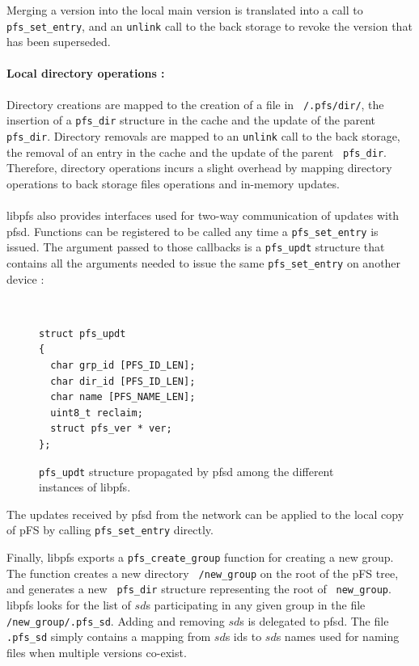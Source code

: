 Merging a version into the local main version is translated into a
call to {\tt pfs\_set\_entry}, and an {\tt unlink} call to the back
storage to revoke the version that has been superseded.

\paragraph{Local directory operations :}
Directory creations are mapped to the creation of a file in {\tt
  /.pfs/dir/}, the insertion of a {\tt pfs\_dir} structure in the
cache and the update of the parent {\tt pfs\_dir}. Directory removals
are mapped to an {\tt unlink} call to the back storage, the removal of
an entry in the cache and the update of the parent {\tt
  pfs\_dir}. Therefore, directory operations incurs a slight overhead
by mapping directory operations to back storage files operations and
in-memory updates.

\paragraph{}

libpfs also provides interfaces used for two-way communication of
updates with pfsd. Functions can be registered to be called
any time a {\tt pfs\_set\_entry} is issued. The argument passed to
those callbacks is a {\tt pfs\_updt} structure that contains all the
arguments needed to issue the same {\tt pfs\_set\_entry} on another
device :

\begin{figure}[ht]
\begin{center}
{\tt \small
\begin{verbatim}
struct pfs_updt
{
  char grp_id [PFS_ID_LEN];
  char dir_id [PFS_ID_LEN];  
  char name [PFS_NAME_LEN];
  uint8_t reclaim;
  struct pfs_ver * ver;
};
\end{verbatim}
}
\end{center}
\caption{\label{MemStruct}
{\small {\tt pfs\_updt} structure propagated by pfsd among the
    different instances of libpfs.}}
\end{figure}

The updates received by pfsd from the network can be applied to the
local copy of pFS by calling {\tt pfs\_set\_entry} directly.

Finally, libpfs exports a {\tt pfs\_create\_group} function for
creating a new group. The function creates a new directory {\tt
  /new\_group} on the root of the pFS tree, and generates a new {\tt
  pfs\_dir} structure representing the root of {\tt
  new\_group}. libpfs looks for the list of $sd$s participating in any
given group in the file {\tt /new\_group/.pfs\_sd}. Adding and
removing $sd$s is delegated to pfsd. The file {\tt .pfs\_sd} simply
contains a mapping from $sd$s ids to $sd$s names used for naming files
when multiple versions co-exist.

